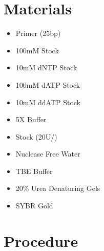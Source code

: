\documentclass{ssiBio}
\begin{document}
\section{Materials}
\begin{itemize}
\item{Primer (25bp)}
\item{100mM \BdATP{} Stock}
\item{10mM dNTP Stock}
\item{100mM dATP Stock}
\item{10mM ddATP Stock}
\item{5X \tdt{} Buffer}
\item{\tdt{} Stock (20U/\uL{})}
\item{Nuclease Free Water}
\item{TBE Buffer}
\item{20\% Urea Denaturing Gels}
\item{SYBR Gold}
\end{itemize}

\section{Procedure}%
\end{document}
